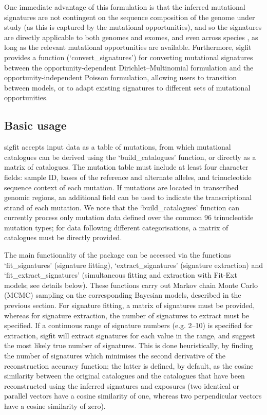 One immediate advantage of this formulation is that the inferred mutational signatures are not contingent on the sequence composition of the genome under study (as this is captured by the mutational opportunities), and so the signatures are directly applicable to both genomes and exomes, and even across species \cite{Stammnitz2018}, as long as the relevant mutational opportunities are available. Furthermore, sigfit provides a function (‘convert\_signatures’) for converting mutational signatures between the opportunity-dependent Dirichlet–Multinomial formulation and the opportunity-independent Poisson formulation, allowing users to transition between models, or to adapt existing signatures to different sets of mutational opportunities.

\subsection*{Basic usage}
sigfit accepts input data as a table of mutations, from which mutational catalogues can be derived using the ‘build\_catalogues’ function, or directly as a matrix of catalogues. The mutation table must include at least four character fields: sample ID, bases of the reference and alternate alleles, and trinucleotide sequence context of each mutation. If mutations are located in transcribed genomic regions, an additional field can be used to indicate the transcriptional strand of each mutation. We note that the ‘build\_catalogues’ function can currently process only mutation data defined over the common 96 trinucleotide mutation types; for data following different categorisations, a matrix of catalogues must be directly provided.

The main functionality of the package can be accessed via the functions ‘fit\_signatures’ (signature fitting), ‘extract\_signatures’ (signature extraction) and ‘fit\_extract\_signatures’ (simultaneous fitting and extraction with Fit-Ext models; see details below). These functions carry out Markov chain Monte Carlo (MCMC) sampling on the corresponding Bayesian models, described in the previous section. For signature fitting, a matrix of signatures must be provided, whereas for signature extraction, the number of signatures to extract must be specified. If a continuous range of signature numbers (e.g. 2–10) is specified for extraction, sigfit will extract signatures for each value in the range, and suggest the most likely true number of signatures. This is done heuristically, by finding the number of signatures which minimises the second derivative of the reconstruction accuracy function; the latter is defined, by default, as the cosine similarity between the original catalogues and the catalogues that have been reconstructed using the inferred signatures and exposures (two identical or parallel vectors have a cosine similarity of one, whereas two perpendicular vectors have a cosine similarity of zero).

